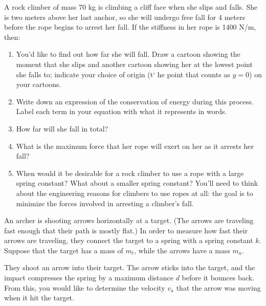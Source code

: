 \documentclass[12pt]{article}
\begin{document}
\Large
\centerline{}
\normalsize
\centerline{}



{A rock climber of mass 70 kg is climbing a cliff face when she slips and falls. She is two meters above her last anchor, so she will undergo free fall for 4 meters before the rope begins to arrest her fall. If the stiffness in her rope is 1400 N/m, then:}
\begin{enumerate}
	\item You'd like to find out how far she will fall. Draw a cartoon showing the moment that she slips and another cartoon showing her at the lowest point she falls to; indicate your choice of origin (t` he point that counts as $y=0$) on your cartoons.
	
	\vspace{2in}
	
	\item Write down an expression of the conservation of energy during this process. Label each term in your equation with what it represents in words.
	
	\vspace{1in}
	
	\item{How far will she fall in total?}
	\vspace{2in}
	
	\item{What is the maximum force that her rope will exert on her as it arrests her fall?}
	\vspace{1.5in}
	
	\item When would it be desirable for a rock climber to use a rope with a large spring constant? What about a smaller spring constant? You'll need to think about 
	the engineering reasons for climbers to use ropes at all: the goal is to minimize the forces involved in arresting a climber's fall.
\end{enumerate}

\newpage

An archer is shooting arrows horizontally at a target. (The arrows are traveling fast enough that their path is mostly flat.) In order to measure how fast their arrows are traveling, they connect the target to a spring with a spring constant $k$. Suppose that the target has a mass of $m_t$, while the arrows have a mass $m_a$.

They shoot an arrow into their target. The arrow sticks into the target, and the impact compresses the spring by a maximum distance $d$ before it bounces back. From this, you would like to determine the velocity $v_a$ that the arrow was moving when it hit the target.
\end{document}
